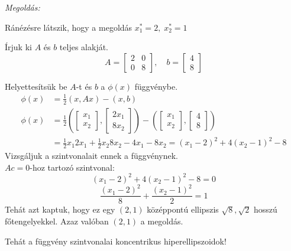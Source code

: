 \textit{Megoldás:}

Ránézésre látszik, hogy a megoldás $x_{1}^{*} = 2, \; x_{2}^{*} = 1$

Írjuk ki $A$ és $b$ teljes alakját.
\begin{equation*}
    A = \begin{bmatrix}
    2 & 0 \\
    0 & 8
    \end{bmatrix}, \quad
    b = \begin{bmatrix}
    4 \\
    8
    \end{bmatrix}
\end{equation*}

Helyettesítsük be $A$-t és $b$ a $\phi(x)$ függvénybe.
\begin{align*}
    \phi(x) & = \frac{1}{2}(x, Ax) - (x, b) \\
    \phi(x) & = \frac{1}{2} \left(\begin{bmatrix}
    x_{1} \\
    x_{2}
    \end{bmatrix}, \begin{bmatrix}
    2x_{1} \\
    8x_{2}
    \end{bmatrix}\right) - \left( \begin{bmatrix}
    x_{1} \\
    x_{2}
    \end{bmatrix}, \begin{bmatrix}
    4 \\
    8
    \end{bmatrix} \right) \\
    & = \frac{1}{2}x_{1}2x_{1} + \frac{1}{2}x_{2}8x_{2} - 4x_{1}-8x_{2} = (x_{1}- 2)^{2} + 4(x_{2}-1)^{2}-8
\end{align*}
Vizsgáljuk a szintvonalait ennek a függvénynek. \\
$Ac = 0$-hoz tartozó szintvonal:
\begin{equation*}
    (x_{1} - 2)^{2} + 4(x_{2} - 1)^{2} - 8 = 0
\end{equation*}
\begin{equation*}
    \frac{(x_{1} - 2)^{2}}{8} + \frac{(x_{2} - 1)^{2}}{2} = 1
\end{equation*}
Tehát azt kaptuk, hogy ez egy $(2, 1)$ középpontú ellipszis $\sqrt{ 8 }, \sqrt{ 2 }$ hosszú főtengelyekkel. Azaz valóban $(2, 1)$ a megoldás.

Tehát a függvény szintvonalai koncentrikus hiperellipszoidok!

